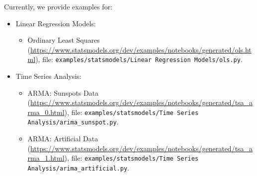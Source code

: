 Currently, we provide examples for:
\begin{itemize}
  \item Linear Regression Models:
    \begin{itemize}
      \item Ordinary Least Squares
        (\url{https://www.statsmodels.org/dev/examples/notebooks/generated/ols.html}),\newline
        file: \texttt{examples/statsmodels/Linear Regression Models/ols.py}.
    \end{itemize}
  \item Time Series Analysis:
    \begin{itemize}
      \item ARMA: Sunspots Data
        (\url{https://www.statsmodels.org/dev/examples/notebooks/generated/tsa_arma_0.html}),\newline
        file: \texttt{examples/statsmodels/Time Series Analysis/arima\_sunspot.py}.
      \item ARMA: Artificial Data
        (\url{https://www.statsmodels.org/dev/examples/notebooks/generated/tsa_arma_1.html}),\newline
        file: \texttt{examples/statsmodels/Time Series Analysis/arima\_artificial.py}.
    \end{itemize}
\end{itemize}
